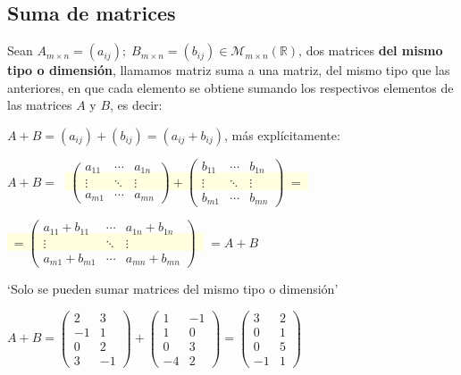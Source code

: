 \subsection{Suma de matrices}

\begin{defi} Sean $A_{m\times n}=(a_{ij}); \; B_{m\times n}=(b_{ij}) \in \mathcal M_{m \times n} (\mathbb R)$, dos matrices \textbf{del mismo tipo o dimensión}, llamamos matriz suma a una matriz, del mismo tipo que las anteriores, en que cada elemento se obtiene sumando los respectivos elementos de las matrices $A$ y $B$, es decir:

$A+B=(a_{ij})+(b_{ij})=(a_{ij}+b_{ij})$, más explícitamente:

\vspace{2mm} $A+B=\;$  \colorbox{LightYellow}{$\boxed{ \; \left( \begin{matrix}  a_{11} & \cdots &  a_{1n} \\
\vdots & \ddots & \vdots \\ a_{m1} & \cdots &  a_{mn}     \end{matrix}\right)+ 
\left( \begin{matrix}  b_{11} & \cdots &  b_{1n} \\
\vdots & \ddots & \vdots \\  b_{m1} & \cdots &  b_{mn}     \end{matrix}\right)\; =\; }$} 

\hspace{1cm} \colorbox{LightYellow}{$\boxed{\; =\left( \begin{matrix}  a_{11}+b_{11} & \cdots &  a_{1n}+b_{1n} \\
\vdots & \ddots & \vdots \\  a_{m1}+b_{m1} & \cdots &  a_{mn}+b_{mn}     \end{matrix}\right)\;}$ } $\; =A+B$

`Solo se pueden sumar matrices del mismo tipo o dimensión'
\end{defi}
\begin{ejem}
$A+B=\left( \begin{matrix} 2&3 \\-1&1\\0&2\\3&-1   \end{matrix}\right) +
\left( \begin{matrix} 1&-1\\1&0\\0&3\\-4&2  \end{matrix}\right)=
\left( \begin{matrix}3&2\\0&1\\0&5\\-1&1   \end{matrix}\right)$	
\end{ejem}
